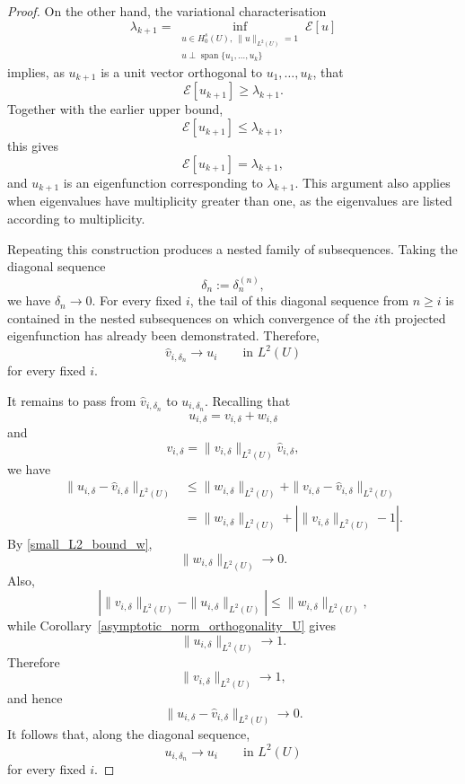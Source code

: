\documentclass[preprint,12pt]{elsarticle}
\begin{document}
{\begin{proof}
On the other hand, the variational characterisation
\[
    \lambda_{k+1}
    =
    \inf_{\substack{
        u\in H_0^s(U),\ \|u\|_{L^2(U)}=1\\
        u\perp\operatorname{span}\{u_1,\ldots,u_k\}
    }}
    \mathcal E[u]
\]
implies, as $u_{k+1}$ is a unit vector orthogonal to
$u_1,\ldots,u_k$, that
\[
    \mathcal E[u_{k+1}]\geq\lambda_{k+1}.
\]
Together with the earlier upper bound,
\[
    \mathcal E[u_{k+1}]
    \leq\lambda_{k+1},
\]
this gives
\[
    \mathcal E[u_{k+1}]
    =
    \lambda_{k+1},
\]
and $u_{k+1}$ is an eigenfunction corresponding to
$\lambda_{k+1}$. This argument also applies when eigenvalues have
multiplicity greater than one, as the eigenvalues are listed
according to multiplicity.

Repeating this construction produces a nested family of subsequences.
Taking the diagonal sequence
\[
    \delta_n:=\delta_n^{(n)},
\]
we have $\delta_n\to0$. For every fixed $i$, the tail of this
diagonal sequence from $n\geq i$ is contained in the nested
subsequences on which convergence of the $i$th projected
eigenfunction has already been demonstrated. Therefore,
\[
    \hat v_{i,\delta_n}
    \longrightarrow u_i
    \qquad\text{in }L^2(U)
\]
for every fixed $i$.

It remains to pass from $\hat v_{i,\delta_n}$ to
$u_{i,\delta_n}$. Recalling that
\[
    u_{i,\delta}=v_{i,\delta}+w_{i,\delta}
\]
and
\[
    v_{i,\delta}
    =
    \|v_{i,\delta}\|_{L^2(U)}\hat v_{i,\delta},
\]
we have
\begin{align*}
    \|u_{i,\delta}-\hat v_{i,\delta}\|_{L^2(U)}
    &\leq
    \|w_{i,\delta}\|_{L^2(U)}
    +
    \|v_{i,\delta}-\hat v_{i,\delta}\|_{L^2(U)}\\
    &=
    \|w_{i,\delta}\|_{L^2(U)}
    +
    \left|
        \|v_{i,\delta}\|_{L^2(U)}-1
    \right|.
\end{align*}
By \eqref{small_L2_bound_w},
\[
    \|w_{i,\delta}\|_{L^2(U)}\longrightarrow0.
\]
Also,
\[
    \left|
        \|v_{i,\delta}\|_{L^2(U)}
        -
        \|u_{i,\delta}\|_{L^2(U)}
    \right|
    \leq
    \|w_{i,\delta}\|_{L^2(U)},
\]
while Corollary~\ref{asymptotic_norm_orthogonality_U} gives
\[
    \|u_{i,\delta}\|_{L^2(U)}\longrightarrow1.
\]
Therefore
\[
    \|v_{i,\delta}\|_{L^2(U)}
    \longrightarrow1,
\]
and hence
\[
    \|u_{i,\delta}-\hat v_{i,\delta}\|_{L^2(U)}
    \longrightarrow0.
\]
It follows that, along the diagonal sequence,
\[
    u_{i,\delta_n}
    \longrightarrow u_i
    \qquad\text{in }L^2(U)
\]
for every fixed $i$.


\end{proof}}
\end{document}
